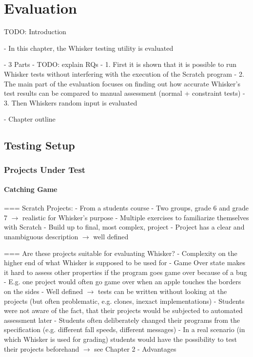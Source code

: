 \chapter{Evaluation}%
\label{cha:evaluation}

TODO: Introduction

- In this chapter, the Whisker testing utility is evaluated

- 3 Parts
- TODO: explain RQs
    - 1. First it is shown that it is possible to run Whisker tests without interfering with the execution of the Scratch program
    - 2. The main part of the evaluation focuses on finding out how accurate Whisker's test results can be compared to manual assessment (normal + constraint tests)
    - 3. Then Whiskers random input is evaluated

- Chapter outline

\section{Testing Setup}

\subsection{Projects Under Test}

\subsubsection*{Catching Game}

=== Scratch Projects:
- From a students course
- Two groups, grade 6 and grade 7 $\rightarrow$ realistic for Whisker's purpose
- Multiple exercises to familiarize themselves with Scratch
- Build up to final, most complex, project
- Project has a clear and unambiguous description $\rightarrow$ well defined

=== Are these projects suitable for evaluating Whisker?
- Complexity on the higher end of what Whisker is supposed to be used for
- Game Over state makes it hard to assess other properties if the program goes game over because of a bug
    - E.g. one project would often go game over when an apple touches the borders on the sides
    - Well defined $\rightarrow$ tests can be written without looking at the projects (but often problematic, e.g. clones, inexact implementations)
- Students were not aware of the fact, that their projects would be subjected to automated assessment later
    - Students often deliberately changed their programs from the specification (e.g. different fall speeds, different messages)
    - In a real scenario (in which Whisker is used for grading) students would have the possibility to test their projects beforehand
    $\rightarrow$ see Chapter 2 - Advantages

